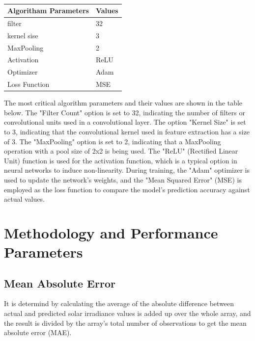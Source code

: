 \documentclass[a4paper,fleqn]{cas-sc}
\begin{document}
\begin{table}[!ht]
\centering
\caption{}
\label{Algorithm Parameters-table}

\begin{tabular}{|p{}| p{}|}
\hline
Algoritham Parameters & Values      \\ \hline
filter        & 32   \\
kernel sise   & 3    \\
MaxPooling    & 2    \\
Activation    & ReLU \\
Optimizer     & Adam \\
Loss Function & MSE  \\ \hline
\end{tabular}
\end{table}

The most critical algorithm parameters and their values are shown in the table below. The "Filter Count" option is set to 32, indicating the number of filters or convolutional units used in a convolutional layer. The option "Kernel Size" is set to 3, indicating that the convolutional kernel used in feature extraction has a size of 3. The "MaxPooling" option is set to 2, indicating that a MaxPooling operation with a pool size of 2x2 is being used. The "ReLU" (Rectified Linear Unit) function is used for the activation function, which is a typical option in neural networks to induce non-linearity. During training, the "Adam" optimizer is used to update the network's weights, and the "Mean Squared Error" (MSE) is employed as the loss function to compare the model's prediction accuracy against actual values.










\section{Methodology and Performance Parameters}

\subsection{Mean Absolute Error}
It is determind by calculating the average of the absolute difference between actual and predicted solar irradiance
values is added up over the whole array, and the result is divided by the array’s total number of observations to get the mean absolute error (MAE)\cite{kumari2021deep}.
\end{document}
